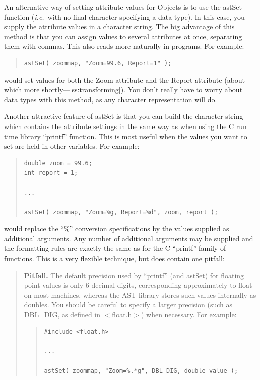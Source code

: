 \documentclass[twoside,11pt]{article}
\newcommand{\htmlref}[2]{#1}
\newcommand{\secref}[1]{\S\ref{#1}}
\renewcommand{\secref}[1]{\ref{#1}}
\begin{document}
An alternative way of setting attribute values for Objects is to use
the \htmlref{astSet}{astSet} function ({\em{i.e.}}\ with no final character specifying a
data type). In this case, you supply the attribute values in a
character string. The big advantage of this method is that you can
assign values to several attributes at once, separating them with
commas. This also reads more naturally in programs. For example:

\begin{quote}
\small
\begin{verbatim}
astSet( zoommap, "Zoom=99.6, Report=1" );
\end{verbatim}
\normalsize
\end{quote}

would set values for both the Zoom attribute and the \htmlref{Report}{Report} attribute
(about which more shortly---\secref{ss:transforming}). You don't really
have to worry about data types with this method, as any character
representation will do.

Another attractive feature of astSet is that you can build the
character string which contains the attribute settings in the same way
as when using the C run time library ``printf'' function. This is most
useful when the values you want to set are held in other
variables. For example:

\begin{quote}
\small
\begin{verbatim}
double zoom = 99.6;
int report = 1;

...

astSet( zoommap, "Zoom=%g, Report=%d", zoom, report );
\end{verbatim}
\normalsize
\end{quote}

would replace the ``\%'' conversion specifications by the values
supplied as additional arguments. Any number of additional arguments
may be supplied and the formatting rules are exactly the same as for
the C ``printf'' family of functions. This is a very flexible
technique, but does contain one pitfall:

\begin{quote}
{\bf{Pitfall.}} The default precision used by ``printf'' (and astSet)
for floating point values is only 6 decimal digits, corresponding
approximately to float on most machines, whereas the AST library
stores such values internally as doubles. You should be careful to
specify a larger precision (such as DBL\_DIG, as defined in
$<$float.h$>$) when necessary. For example:

\begin{quote}
\small
\begin{verbatim}
#include <float.h>

...

astSet( zoommap, "Zoom=%.*g", DBL_DIG, double_value );
\end{verbatim}
\normalsize
\end{quote}
\end{quote}
\end{document}
